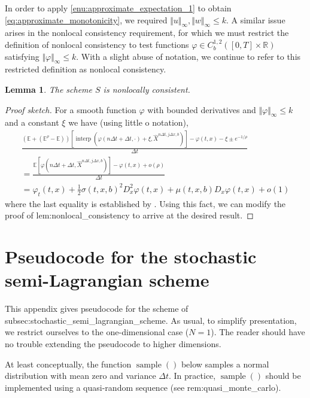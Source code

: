 \documentclass[12pt]{article}
\newcounter{dummy}
\newtheorem{lemma}[dummy]{Lemma}
\begin{document}
In order to apply \ref{enu:approximate_expectation_1} to obtain \eqref{eq:approximate_monotonicity},
we required $\Vert u\Vert_{\infty},\Vert w\Vert_{\infty}{\leqslant} k$.
A similar issue arises in the nonlocal consistency requirement, for
which we must restrict the definition of nonlocal consistency to test
functions $\varphi\in C_{b}^{1,2}([0,T]\times\mathbb{R})$ satisfying
$\Vert\varphi\Vert_{\infty}{\leqslant} k$. With a slight abuse of notation,
we continue to refer to this restricted definition as nonlocal consistency.
\begin{lemma}
The scheme $S$ is nonlocally consistent.
\end{lemma}
\begin{proof}[Proof sketch]
For a smooth function $\varphi$ with bounded derivatives and $\Vert\varphi\Vert_{\infty}{\leqslant} k$
and a constant $\xi$ we have (using little o notation),
\begin{multline*}
\frac{(\mathbb{E}+\left(\mathbb{E}^{\rho}-\mathbb{E}\right))\left[{\operatorname{interp}}(\varphi(n\Delta t+\Delta t,\cdot)+\xi,\hat{X}^{n\Delta t,j\Delta x,b})\right]-\varphi(t,x)-\xi\pm e^{-1/\rho}}{\Delta t}\\
=\frac{\mathbb{E}\left[\varphi(n\Delta t+\Delta t,\hat{X}^{n\Delta t,j\Delta x,b})\right]-\varphi(t,x)+o(\rho)}{\Delta t}\\
=\varphi_{t}(t,x)+\frac{1}{2}\sigma(t,x,b)^{2}D_{x}^{2}\varphi(t,x)+\mu(t,x,b)D_{x}\varphi(t,x)+o(1)
\end{multline*}
where the last equality is established by \cite[Lemma 3.1]{MR2857450}.
Using this fact, we can modify the proof of {\prettyref}{lem:nonlocal_consistency}
to arrive at the desired result.
\end{proof}

\section{\label{app:stochastic_semi_lagrangian_pseudocode}Pseudocode for
the stochastic semi-Lagrangian scheme}

This appendix gives pseudocode for the scheme of {\prettyref}{subsec:stochastic_semi_lagrangian_scheme}.
As usual, to simplify presentation, we restrict ourselves to the one-dimensional
case ($N=1$). The reader should have no trouble extending the pseudocode
to higher dimensions.

At least conceptually, the function $\operatorname{sample}()$ below
samples a normal distribution with mean zero and variance $\Delta t$.
In practice, $\operatorname{sample}()$ should be implemented using
a quasi-random sequence (see {\prettyref}{rem:quasi_monte_carlo}).
\end{document}
